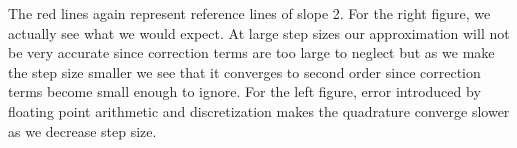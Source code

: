 \documentclass[10pt]{article}
\begin{document}
\noindent The red lines again represent reference lines of slope 2. For the right figure, we actually see what we would expect. At large step sizes our approximation will not be very accurate since correction terms are too large to neglect but as we make the step size smaller we see that it converges to second order since correction terms become small enough to ignore. For the left figure, error introduced by floating point arithmetic and discretization makes the quadrature converge slower as we decrease step size.
\end{document}
